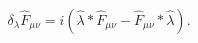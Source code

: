 \begin{equation}
\delta_{\lambda }\widehat{F}_{\mu\nu} =i\left( \widehat{\lambda }%
\ast \widehat{F}_{\mu\nu}-\widehat{F}_{\mu\nu}\ast\widehat{\lambda }\right).\label{trafoefenc}
\end{equation}

